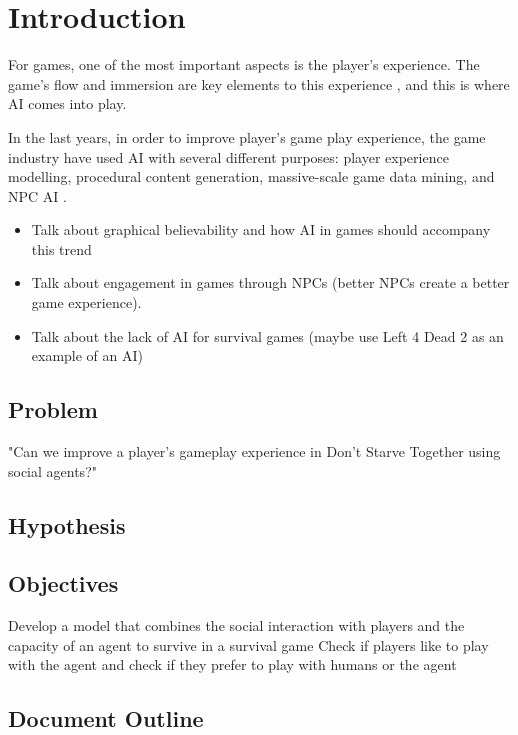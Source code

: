 \section{Introduction}
\label{sec:introduction}
For games, one of the most important aspects is the player's experience.
The game's flow and immersion are key elements to this experience \cite{ijsselsteijn:userexperience}, and this is where \ac{AI} comes into play.

In the last years, in order to improve player's game play experience, the game industry have used \ac{AI} with several different purposes: player experience modelling, procedural content generation, massive-scale game data mining, and \ac{NPC} \ac{AI} \cite{yannakakis:gameairevisited}.

\begin{itemize}
	\item Talk about graphical believability and how AI in games should accompany this trend
	\item Talk about engagement in games through NPCs (better NPCs create a better game experience).
	\item Talk about the lack of AI for survival games (maybe use Left 4 Dead 2 as an example of an AI)
\end{itemize}

\subsection{Problem}
"Can we improve a player's gameplay experience in Don't Starve Together using social agents?"

\subsection{Hypothesis}


\subsection{Objectives}
Develop a model that combines the social interaction with players and the capacity of an agent to survive in a survival game
Check if players like to play with the agent
and check if they prefer to play with humans or the agent

\subsection{Document Outline}